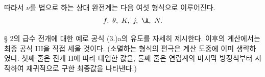 
\bigskip

따라서 $\nu$를 법으로 하는 상대 완전계는 다음 여섯 형식으로 이루어진다.
\[
f,\ \theta,\ K,\ j,\ \A,\ N.
\]

§ 2의 급수 전개에 대한 예로 공식 (3.)a의 유도를 자세히 제시한다. 이후의 계산에서는 최종 공식 III을 직접 세울 것이다. (소멸하는 형식의 편극은 계산 도중에 이미 생략하였다. 첫째 줄은 전개 II에 따라 대입한 값을, 둘째 줄은 연립계의 마지막 방정식부터 시작하여 재귀적으로 구한 최종값을 나타낸다.)
